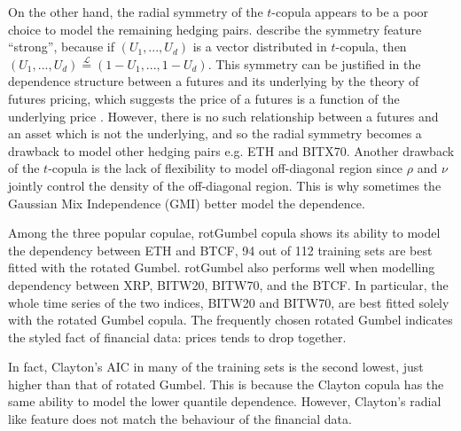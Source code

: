 On the other hand, the radial symmetry of the $t$-copula appears to be
a poor choice to model the remaining hedging pairs.
\cite{demarta2005t} describe the symmetry feature ``strong'', because if
$(U_1, ..., U_d)$ is a vector distributed in $t$-copula, 
then $(U_1, ..., U_d) \overset{\mathcal{L}}= (1-U_1, ...,
1-U_d)$. 
This symmetry can be justified in the dependence structure between a
futures and its underlying by the theory of futures pricing, 
which suggests the price of a futures is a function of the underlying
price \citep{hull2003options}. 
However, there is no such relationship between a futures and an asset
which is not the underlying, and so the radial symmetry becomes a
drawback to model other hedging pairs e.g. ETH and BITX70. 
Another drawback of the $t$-copula is the lack of flexibility to model
off-diagonal region since $\rho$ and $\nu$ jointly control the density
of the off-diagonal region. 
This is why sometimes the Gaussian Mix Independence (GMI) better model
the dependence.  

Among the three popular copulae, rotGumbel copula shows its ability to model the dependency between ETH and BTCF,
94 out of 112 training sets are best fitted with the rotated Gumbel.
rotGumbel also performs well when modelling dependency between XRP, BITW20, BITW70, and the BTCF.
In particular, the whole time series of the two indices, BITW20 and BITW70, are best fitted solely with the rotated Gumbel copula.
The frequently chosen rotated Gumbel indicates the styled fact of
financial data: prices tends to drop together.  

In fact, Clayton's AIC in many of the training sets is the second lowest, just higher than that of rotated Gumbel.
This is because the Clayton copula has the same ability to model the lower quantile dependence.
However, Clayton's radial like feature does not match the behaviour of
the financial data.


